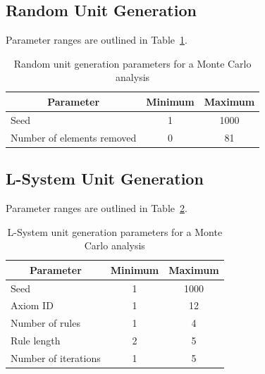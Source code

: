\subsection{Random Unit Generation}

Parameter ranges are outlined in Table~\ref{tab:ranmc}.

\begin{table}[H]
\centering
\caption{Random unit generation parameters for a Monte Carlo analysis}
\label{tab:ranmc}
\begin{tabular}{@{}lcc@{}}
\toprule
\multicolumn{1}{c}{\textbf{Parameter}} & \textbf{Minimum} & \textbf{Maximum} \\ \midrule
Seed                                   & 1                & 1000             \\
Number of elements removed             & 0                & 81               \\ \bottomrule
\end{tabular}
\end{table}

\subsection{L-System Unit Generation}

Parameter ranges are outlined in Table~\ref{tab:lsmc}.

\begin{table}[H]
\centering
\caption{L-System unit generation parameters for a Monte Carlo analysis}
\label{tab:lsmc}
\begin{tabular}{@{}lcc@{}}
\toprule
\multicolumn{1}{c}{\textbf{Parameter}} & \textbf{Minimum} & \textbf{Maximum} \\ \midrule
Seed                                   & 1                & 1000             \\
Axiom ID                               & 1                & 12               \\
Number of rules                        & 1                & 4                \\
Rule length                            & 2                & 5                \\
Number of iterations                   & 1                & 5                \\ \bottomrule
\end{tabular}
\end{table}

